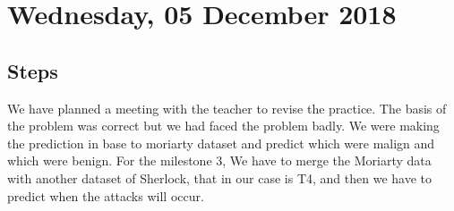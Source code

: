 \section{Wednesday, 05 December 2018}

\subsection{Steps}
We have planned a meeting with the teacher to revise the practice. The basis of the problem was correct but we had faced the problem badly. We were making the prediction in base to moriarty dataset and predict which were malign and which were benign. 
For the milestone 3, We have to merge the Moriarty data with another dataset of Sherlock, that in our case is T4, and then we have to predict when the attacks will occur.